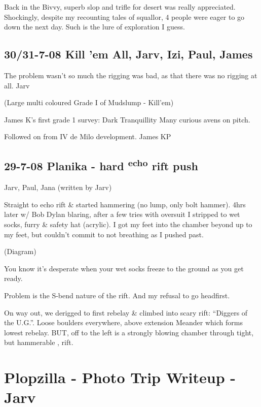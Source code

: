 Back in the Bivvy, superb slop and trifle for desert was really
appreciated. Shockingly, despite my recounting tales of squallor, 4
people were eager to go down the next day. Such is the lure of
exploration I guess.


\subsection{30/31-7-08 Kill 'em All, Jarv, Izi, Paul,
James}\label{kill-em-all-jarv-izi-paul-james}

The problem wasn't so much the rigging was bad, as that there was no
rigging at all. Jarv

(Large multi coloured Grade I of Mudslump - Kill'em)

James K's first grade 1 survey: Dark Tranquillity Many curious avens on
pitch.

Followed on from IV de Milo development. James KP

\subsection{\texorpdfstring{29-7-08 Planika - hard
\textsuperscript{echo} rift
push}{29-7-08 Planika - hard echo rift push}}\label{planika---hard-echo-rift-push}

Jarv, Paul, Jana (written by Jarv)

Straight to echo rift \& started hammering (no lump, only bolt hammer).
4hrs later w/ Bob Dylan blaring, after a few tries with oversuit I
stripped to wet socks, furry \& safety hat (acrylic). I got my feet into
the chamber beyond up to my feet, but couldn't commit to not breathing
as I pushed past.

(Diagram)

You know it's desperate when your wet socks freeze to the ground as you
get ready.

Problem is the S-bend nature of the rift. And my refusal to go
headfirst.

On way out, we derigged to first rebelay \& climbed into scary rift:
``Diggers of the U.G.''. Loose boulders everywhere, above extension
Meander which forms lowest rebelay. BUT, off to the left is a strongly
blowing chamber through tight, but hammerable , rift.

\section{Plopzilla - Photo Trip Writeup -
Jarv}\label{plopzilla---photo-trip-writeup---jarv}

